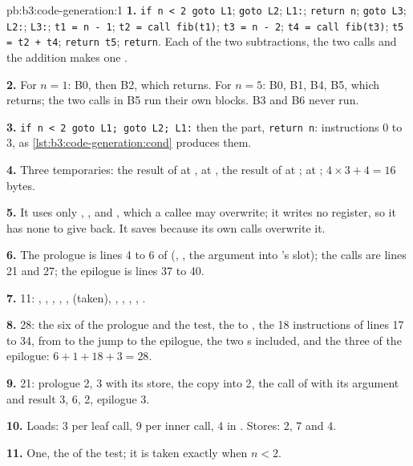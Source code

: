 \begin{solution}{pb:b3:code-generation:1}
\textbf{1.} \texttt{if n < 2 goto L1}; \texttt{goto L2}; \texttt{L1:}; \texttt{return n}; \texttt{goto L3}; \texttt{L2:}; \texttt{L3:}; \texttt{t1 = n - 1}; \texttt{t2 = call fib(t1)}; \texttt{t3 = n - 2}; \texttt{t4 = call fib(t3)}; \texttt{t5 = t2 + t4}; \texttt{return t5}; \texttt{return}. Each of the two subtractions, the two calls and the addition makes one .

\textbf{2.} For $n = 1$: B0, then B2, which returns. For $n = 5$: B0, B1, B4, B5, which returns; the two calls in B5 run their own blocks. B3 and B6 never run.

\textbf{3.} \texttt{if n < 2 goto L1; goto L2; L1:} then the  part, \texttt{return n}: instructions 0 to 3, as \cref{lst:b3:code-generation:cond} produces them.

\textbf{4.} Three temporaries: the result of  at ,  at , the result of  at ;  at ; $4 \times 3 + 4 = 16$ bytes.

\textbf{5.} It uses only , ,  and , which a callee may overwrite; it writes no  register, so it has none to give back. It saves  because its own calls overwrite it.

\textbf{6.} The prologue is lines 4 to 6 of  (, , the argument into 's slot); the calls are lines 21 and 27; the epilogue is lines 37 to 40.

\textbf{7.} 11: , , , , ,  (taken), , , , , .

\textbf{8.} 28: the six of the prologue and the test, the  to , the 18 instructions of lines 17 to 34, from  to the jump to the epilogue, the two s included, and the three of the epilogue: $6 + 1 + 18 + 3 = 28$.

\textbf{9.} 21: prologue 2,  3 with its store, the copy into  2, the call of  with its argument and result 3,  6,  2, epilogue 3.

\textbf{10.} Loads: 3 per leaf call, 9 per inner call, 4 in . Stores: 2, 7 and 4.

\textbf{11.} One, the  of the test; it is taken exactly when $n < 2$.


\end{solution}
